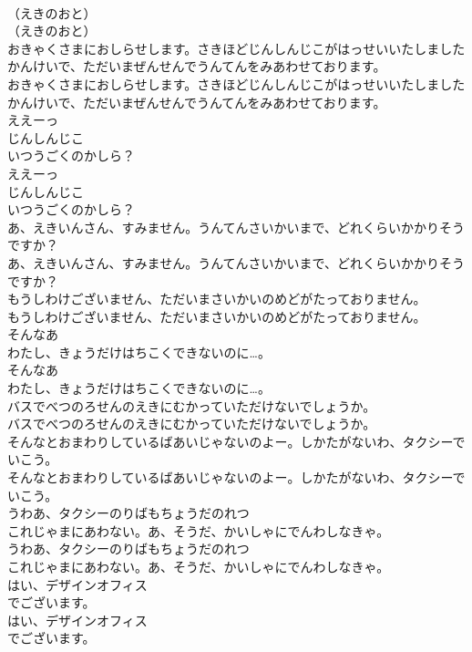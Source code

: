 \documentclass[8pt]{extreport}
\begin{document}
\begin{CJK}{UTF8}{min}
\\	（えきのおと）
\\	（えきのおと）
\\	おきゃくさまにおしらせします。さきほどじんしんじこがはっせいいたしましたかんけいで、ただいまぜんせんでうんてんをみあわせております。
\\	おきゃくさまにおしらせします。さきほどじんしんじこがはっせいいたしましたかんけいで、ただいまぜんせんでうんてんをみあわせております。
\\	ええーっ
\\	じんしんじこ
\\	いつうごくのかしら？
\\	ええーっ
\\	じんしんじこ
\\	いつうごくのかしら？
\\	あ、えきいんさん、すみません。うんてんさいかいまで、どれくらいかかりそうですか？
\\	あ、えきいんさん、すみません。うんてんさいかいまで、どれくらいかかりそうですか？
\\	もうしわけございません、ただいまさいかいのめどがたっておりません。
\\	もうしわけございません、ただいまさいかいのめどがたっておりません。
\\	そんなあ
\\	わたし、きょうだけはちこくできないのに…。
\\	そんなあ
\\	わたし、きょうだけはちこくできないのに…。
\\	バスでべつのろせんのえきにむかっていただけないでしょうか。
\\	バスでべつのろせんのえきにむかっていただけないでしょうか。
\\	そんなとおまわりしているばあいじゃないのよー。しかたがないわ、タクシーでいこう。
\\	そんなとおまわりしているばあいじゃないのよー。しかたがないわ、タクシーでいこう。
\\	うわあ、タクシーのりばもちょうだのれつ
\\	これじゃまにあわない。あ、そうだ、かいしゃにでんわしなきゃ。
\\	うわあ、タクシーのりばもちょうだのれつ
\\	これじゃまにあわない。あ、そうだ、かいしゃにでんわしなきゃ。
\\	はい、デザインオフィス
\\	でございます。
\\	はい、デザインオフィス
\\	でございます。

\end{CJK}
\end{document}
